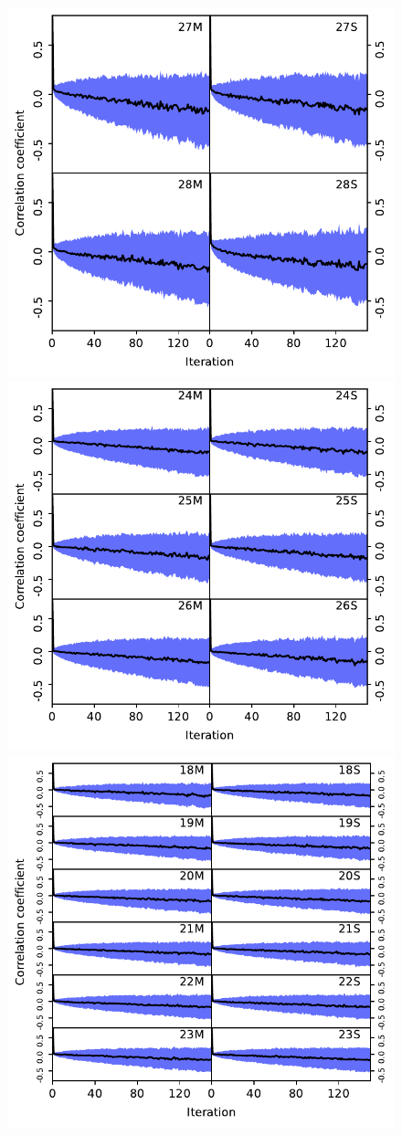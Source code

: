 \documentclass[twocolumn]{aa}
\begin{document}
\begin{figure}[t]
  \center
    \includegraphics[width=0.8\linewidth]{figs/corrlengths_030.pdf}\\\vspace*{-2mm}
    \includegraphics[width=0.8\linewidth]{figs/corrlengths_044.pdf}\\\vspace*{-2mm}
    \includegraphics[width=0.8\linewidth]{figs/corrlengths_070.pdf}


\end{figure}
\end{document}

